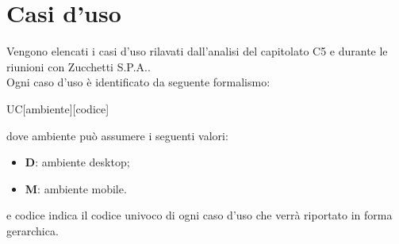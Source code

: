 \section{Casi d'uso}
Vengono elencati i casi d'uso rilavati dall'analisi del capitolato C5 e durante le riunioni con Zucchetti S.P.A.. \\
Ogni caso d'uso è identificato da seguente formalismo:
\begin{center}
	UC[ambiente][codice]
\end{center}
dove ambiente può assumere i seguenti valori:
\begin{itemize}
	\item \textbf{D}: ambiente desktop;
	\item \textbf{M}: ambiente mobile.
\end{itemize}
e codice indica il codice univoco di ogni caso d'uso che verrà riportato in forma gerarchica.


